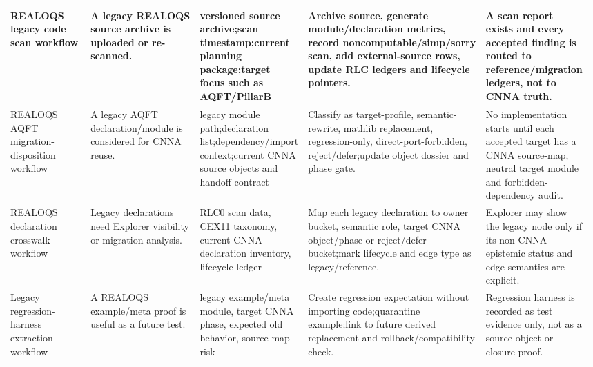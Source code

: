 \begin{longtable}{L{0.14\linewidth} L{0.19\linewidth} L{0.18\linewidth} L{0.31\linewidth} L{0.16\linewidth}}
\hline
\addlinespace[0.24em]
REALOQS legacy code scan workflow & A legacy REALOQS source archive is uploaded or re-scanned. & versioned source archive;\newline scan timestamp;\newline current planning package;\newline target focus such as AQFT/\allowbreak{}PillarB & Archive source, generate module/\allowbreak{}declaration metrics, record noncomputable/\allowbreak{}simp/\allowbreak{}sorry scan, add external-source rows, update RLC ledgers and lifecycle pointers. & A scan report exists and every accepted finding is routed to reference/\allowbreak{}migration ledgers, not to CNNA truth.\\
\hline
\addlinespace[0.24em]
REALOQS AQFT migration-disposition workflow & A legacy AQFT declaration/\allowbreak{}module is considered for CNNA reuse. & legacy module path;\newline declaration list;\newline dependency/\allowbreak{}import context;\newline current CNNA source objects and handoff contract & Classify as target-profile, semantic-rewrite, mathlib replacement, regression-only, direct-port-forbidden, reject/\allowbreak{}defer;\newline update object dossier and phase gate. & No implementation starts until each accepted target has a CNNA source-map, neutral target module and forbidden-dependency audit.\\
\hline
\addlinespace[0.24em]
REALOQS declaration crosswalk workflow & Legacy declarations need Explorer visibility or migration analysis. & RLC0 scan data, CEX11 taxonomy, current CNNA declaration inventory, lifecycle ledger & Map each legacy declaration to owner bucket, semantic role, target CNNA object/\allowbreak{}phase or reject/\allowbreak{}defer bucket;\newline mark lifecycle and edge type as legacy/\allowbreak{}reference. & Explorer may show the legacy node only if its non-CNNA epistemic status and edge semantics are explicit.\\
\hline
\addlinespace[0.24em]
Legacy regression-harness extraction workflow & A REALOQS example/\allowbreak{}meta proof is useful as a future test. & legacy example/\allowbreak{}meta module, target CNNA phase, expected old behavior, source-map risk & Create regression expectation without importing code;\newline quarantine example;\newline link to future derived replacement and rollback/\allowbreak{}compatibility check. & Regression harness is recorded as test evidence only, not as a source object or closure proof.\\

\end{longtable}
